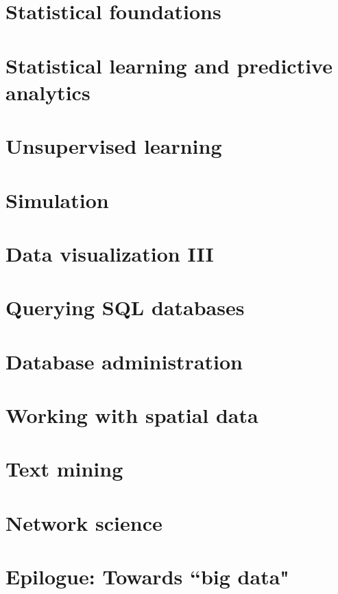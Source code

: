 \documentclass[oneside]{book}
\numberwithin{Answer}{chapter}
\numberwithin{Exercise}{chapter}
\begin{document}
\chapter{Statistical foundations}


\chapter{Statistical learning and predictive analytics}


\chapter{Unsupervised learning}


\chapter{Simulation}




\chapter{Data visualization III}


\chapter{Querying SQL databases}


\chapter{Database administration}


\chapter{Working with spatial data}


\chapter{Text mining}


\chapter{Network science}


\chapter{Epilogue: Towards ``big data"}
\end{document}

